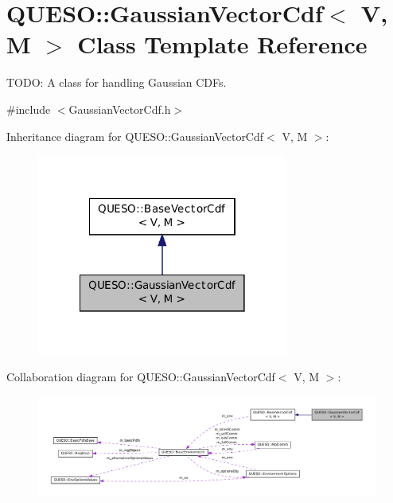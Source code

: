 \hypertarget{class_q_u_e_s_o_1_1_gaussian_vector_cdf}{\section{Q\-U\-E\-S\-O\-:\-:Gaussian\-Vector\-Cdf$<$ V, M $>$ Class Template Reference}
\label{class_q_u_e_s_o_1_1_gaussian_vector_cdf}
}


T\-O\-D\-O\-: A class for handling Gaussian C\-D\-Fs.  




{\ttfamily \#include $<$Gaussian\-Vector\-Cdf.\-h$>$}



Inheritance diagram for Q\-U\-E\-S\-O\-:\-:Gaussian\-Vector\-Cdf$<$ V, M $>$\-:
\nopagebreak
\begin{figure}[H]
\begin{center}
\leavevmode
\includegraphics[width=234pt]{class_q_u_e_s_o_1_1_gaussian_vector_cdf__inherit__graph}
\end{center}
\end{figure}


Collaboration diagram for Q\-U\-E\-S\-O\-:\-:Gaussian\-Vector\-Cdf$<$ V, M $>$\-:
\nopagebreak
\begin{figure}[H]
\begin{center}
\leavevmode
\includegraphics[width=350pt]{class_q_u_e_s_o_1_1_gaussian_vector_cdf__coll__graph}
\end{center}
\end{figure}
